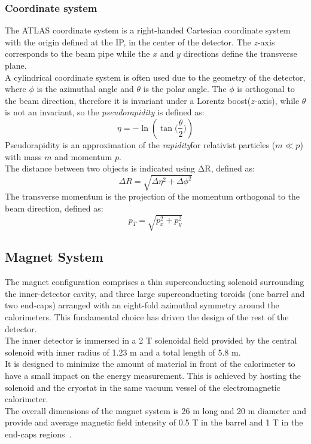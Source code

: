 \subsubsection*{Coordinate system}
The ATLAS coordinate system is a right-handed Cartesian coordinate system with the origin defined at the IP, in the center of the detector.
The $z$-axis corresponds to the beam pipe while the $x$ and $y$ directions define the transverse plane.\\
A cylindrical coordinate system is often used due to the geometry of the detector, where $\phi$ is the azimuthal angle and $\theta$ is the polar angle. 
The $\phi$ is orthogonal to the beam direction, therefore it is invariant under a Lorentz boost($z$-axis), while $\theta$ is not an invariant, so the \textit{pseudorapidity} is defined as:
\begin{equation}
\eta=-\ln{(\tan{\bigg(\frac{\theta}{2}\bigg)})}
\end{equation}
Pseudorapidity is an approximation of the \textit{rapidity}\footnotemark for relativist particles ($m\ll p$) with mass $m$ and momentum $p$.
\\The distance between two objects is indicated using $\mathrm{\Delta R}$, defined as:
\begin{equation}
\Delta R =\sqrt{\Delta \eta^{2}+\Delta \phi^{2}}
\end{equation}
The transverse momentum is the projection of the momentum orthogonal to the beam direction, defined as:
\begin{equation}
p_{T}=\sqrt{p^{2}_{x}+p^{2}_{y}}
\end{equation}

\subsection{Magnet System}
\label{sec:MagSys}
The magnet configuration comprises a thin superconducting solenoid surrounding the inner-detector cavity, and three large superconducting toroids (one barrel and two end-caps) arranged with an eight-fold azimuthal symmetry around the calorimeters. This fundamental choice has driven the design of the rest of the detector.\\
The inner detector is immersed in a 2 T solenoidal field provided by the central solenoid with inner radius of 1.23 m and a total length of 5.8 m.\\
It is designed to minimize the amount of material in front of the calorimeter to have a small impact on the energy measurement. This is achieved by hosting the solenoid and
the cryostat in the same vacuum vessel of the electromagnetic calorimeter.\\
The overall dimensions of the magnet system is 26 m long and 20 m diameter and provide and average magnetic field intensity of 0.5 T in the barrel and 1 T in the end-caps regions~\cite{MagSys}.
\clearpage
